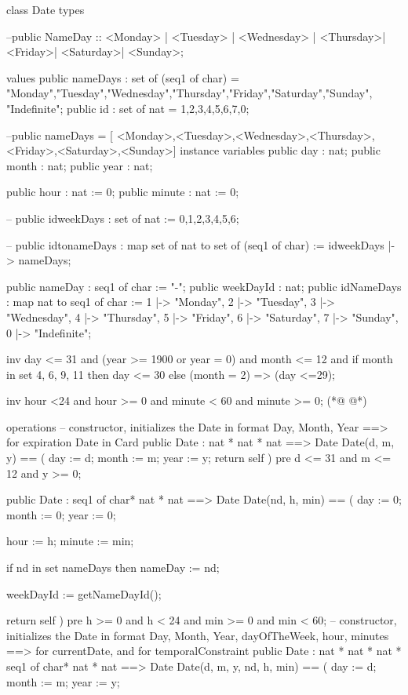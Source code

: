 \begin{vdmpp}[breaklines=true]
class Date
types


--public NameDay :: <Monday> | <Tuesday> | <Wednesday> | <Thursday>| <Friday>| <Saturday>| <Sunday>;

values
 public nameDays : set of (seq1 of char) = { "Monday","Tuesday","Wednesday","Thursday","Friday","Saturday","Sunday", "Indefinite"};
 public id : set of nat = {1,2,3,4,5,6,7,0};

 --public nameDays = [ <Monday>,<Tuesday>,<Wednesday>,<Thursday>,<Friday>,<Saturday>,<Sunday>]
instance variables
 public day : nat;
 public month : nat;
 public year : nat;
 
 public hour : nat := 0;
 public minute : nat := 0;
 
-- public idweekDays : set of nat := {0,1,2,3,4,5,6};

-- public idtonameDays : map set of nat to set of (seq1 of char) := {idweekDays |-> nameDays};
 
 public nameDay : seq1 of char := "-";
 public weekDayId : nat;
  public idNameDays : map nat to seq1 of char :=  {1 |-> "Monday", 2 |-> "Tuesday", 3 |-> "Wednesday", 4 |-> "Thursday", 5 |-> "Friday", 6 |-> "Saturday", 7 |-> "Sunday", 0 |-> "Indefinite"};

inv day <= 31 and
  (year >= 1900 or year = 0) and
  month <= 12 and
  if month in set {4, 6, 9, 11}
  then day <= 30
  else (month = 2) => (day <=29);
  
inv hour <24 and hour >= 0 and minute < 60 and minute >= 0;
(*@
\label{Date:36}
@*)
  
 operations
 -- constructor, initializes the Date in format Day, Month, Year ==> for expiration Date in Card
 public Date : nat * nat * nat ==> Date
  Date(d, m, y) == (  
    day := d;
    month := m;
    year := y;
    return self
  )
  pre d <= 31 and m <= 12 and y >= 0;
  
  public Date : seq1 of char* nat * nat ==> Date
  Date(nd, h, min) == (
    day := 0;
    month := 0;
    year := 0;
    
    hour := h;
    minute := min;

    if nd in set nameDays
    then nameDay := nd;
    
    weekDayId := getNameDayId();
      
    return self
  )
  pre h >= 0 and h < 24 and min >= 0 and min < 60;
 -- constructor, initializes the Date in format Day, Month, Year, dayOfTheWeek, hour, minutes ==> for currentDate, and for temporalConstraint
  public Date : nat * nat * nat * seq1 of char* nat * nat ==> Date
  Date(d, m, y, nd, h, min) == (
    day := d;
    month := m;
    year := y;
    

\end{vdmpp}
